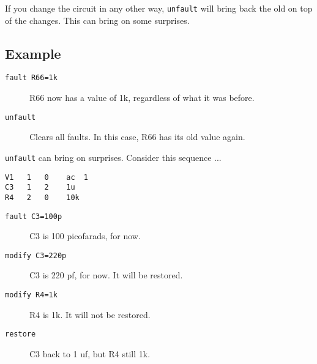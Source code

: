 If you change the circuit in any other way, {\tt unfault} will bring back the
old on top of the changes.  This can bring on some surprises.
\subsection{Example}

\begin{description}

\item[{\tt fault R66=1k}] R66 now has a value of 1k, regardless of what it
was before.

\item[{\tt unfault}] Clears all faults.  In this case, R66 has its old value
again.

\end{description}

{\tt unfault} can bring on surprises.  Consider this sequence ...

\begin{verbatim}
V1   1   0    ac  1
C3   1   2    1u
R4   2   0    10k
\end{verbatim}

\begin{description}

\item[{\tt fault C3=100p}] C3 is 100 picofarads, for now.

\item[{\tt modify C3=220p}] C3 is 220 pf, for now.  It will be restored.

\item[{\tt modify R4=1k}] R4 is 1k.  It will not be restored.

\item[{\tt restore}] C3 back to 1 uf, but R4 still 1k.

\end{description}
